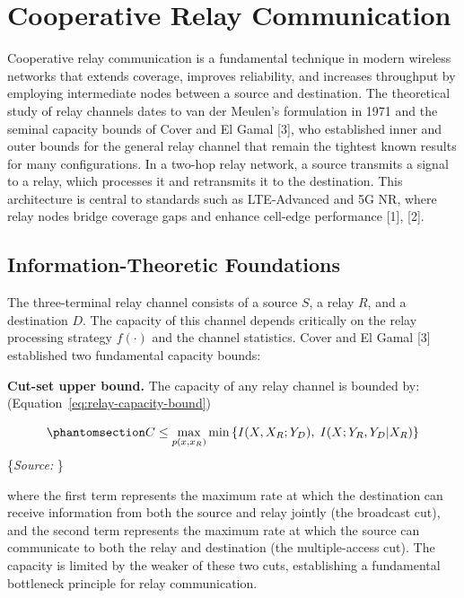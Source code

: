 \documentclass[
  english,
  12pt,
  12pt,
  a4paper,
  oneside]{report}
\begin{document}
\section{Cooperative Relay Communication}\label{sec:cooperative-relay-communication}

Cooperative relay communication is a fundamental technique in modern wireless networks that extends coverage, improves reliability, and increases throughput by employing intermediate nodes between a source and destination. The theoretical study of relay channels dates to van der Meulen's formulation in 1971 and the seminal capacity bounds of Cover and El Gamal {[}3{]}, who established inner and outer bounds for the general relay channel that remain the tightest known results for many configurations. In a two-hop relay network, a source transmits a signal to a relay, which processes it and retransmits it to the destination. This architecture is central to standards such as LTE-Advanced and 5G NR, where relay nodes bridge coverage gaps and enhance cell-edge performance {[}1{]}, {[}2{]}.

\subsection{Information-Theoretic Foundations}\label{sec:information-theoretic-foundations}

The three-terminal relay channel consists of a source \(S\), a relay \(R\), and a destination \(D\). The capacity of this channel depends critically on the relay processing strategy \(f(\cdot)\) and the channel statistics. Cover and El Gamal {[}3{]} established two fundamental capacity bounds:

\textbf{Cut-set upper bound.} The capacity of any relay channel is bounded by: (Equation~\ref{eq:relay-capacity-bound})

\begin{equation}\protect\phantomsection\label{eq:relay-capacity-bound}{C \leq \max_{p(x, x_R)} \min\left\{I(X, X_R; Y_D), \; I(X; Y_R, Y_D | X_R)\right\}
}\end{equation} \footnotesize\{\textit{Source: \1}\}\normalsize

where the first term represents the maximum rate at which the destination can receive information from both the source and relay jointly (the broadcast cut), and the second term represents the maximum rate at which the source can communicate to both the relay and destination (the multiple-access cut). The capacity is limited by the weaker of these two cuts, establishing a fundamental bottleneck principle for relay communication.
\end{document}
